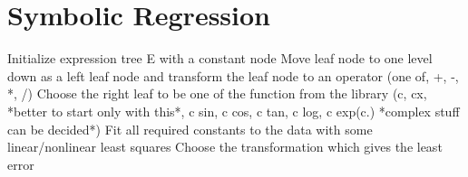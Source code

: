 \documentclass[
12pt,
a4paper,
twocolumn,
landscape
]{article}
\title{}
\begin{document}
\section*{Symbolic Regression}

\begin{algorithmic}
    \STATE Initialize expression tree E with a constant node
    \STATE Move leaf node to one level down as a left leaf node and transform the leaf node to an operator (one of, +, -, *, /)
    \STATE Choose the right leaf to be one of the function from the library (c, cx, *better to start only with this*, c sin, c cos, c tan, c log, c exp(c.) *complex stuff can be decided*)
    \STATE Fit all required constants to the data with some linear/nonlinear least squares
    \ENDFOR
    \STATE Choose the transformation which gives the least error
    \ENDFOR
\end{algorithmic}
\end{document}
